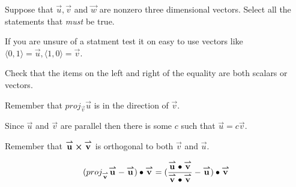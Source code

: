 \documentclass{ximera}
\author{Jim Talamo}
\begin{document}
\begin{exercise}
Suppose that $\vec u , \vec v $ and $\vec w $ are nonzero three dimensional vectors. Select all the statements that \emph{must} be true.

\begin{selectAll}
\end{selectAll}

\begin{hint}
If you are unsure of a statment test it on easy to use vectors like $\langle 0,1 \rangle =\vec u , \langle 1,0 \rangle = \vec v$.
\end{hint}

\begin{hint}
Check that the items on the left and right of the equality are both scalars or vectors.
\end{hint}

\begin{hint}
Remember that $proj_{\vec v} \vec u$ is in the direction of $\vec v$.
\end{hint}

\begin{hint}
Since $\vec u$ and $\vec v$ are parallel then there is some $c$ such that $\vec u = c \vec v$.
\end{hint}

\begin{hint}
Remember that $\vec u \cross \vec v$ is orthogonal to both $\vec v$ and $\vec u$.
\end{hint}

\begin{hint}
\[
(proj_{\vec v} \vec u -\vec u) \dotp \vec v = (\frac {\vec u \dotp \vec v} {\vec v\dotp \vec v} -\vec u) \dotp \vec v
\]
\end{hint}
\end{exercise}
\end{document}
